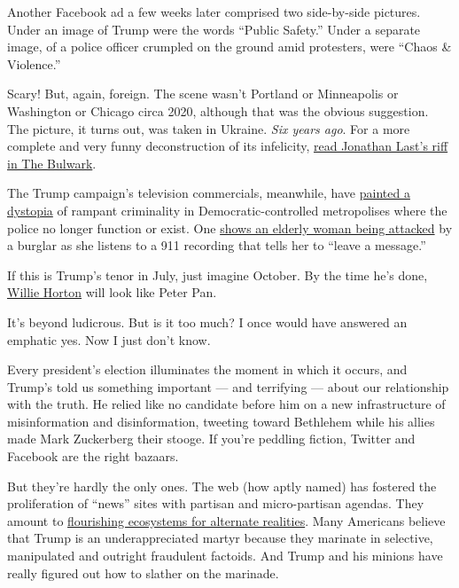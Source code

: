 Another Facebook ad a few weeks later comprised two side-by-side
pictures. Under an image of Trump were the words ``Public Safety.''
Under a separate image, of a police officer crumpled on the ground amid
protesters, were ``Chaos \& Violence.''

Scary! But, again, foreign. The scene wasn't Portland or Minneapolis or
Washington or Chicago circa 2020, although that was the obvious
suggestion. The picture, it turns out, was taken in Ukraine. \emph{Six
years ago}. For a more complete and very funny deconstruction of its
infelicity, \href{https://thebulwark.com/trumps-new-ad-is-amazing/}{read
Jonathan Last's riff in The Bulwark}.

The Trump campaign's television commercials, meanwhile, have
\href{https://www.nytimes3xbfgragh.onion/2020/07/21/us/politics/trump-portland-federal-agents.html}{painted
a dystopia} of rampant criminality in Democratic-controlled metropolises
where the police no longer function or exist. One
\href{https://www.nytimes3xbfgragh.onion/2020/07/21/us/politics/trump-portland-federal-agents.html}{shows
an elderly woman being attacked} by a burglar as she listens to a 911
recording that tells her to ``leave a message.''

If this is Trump's tenor in July, just imagine October. By the time he's
done,
\href{https://www.cnn.com/2018/11/01/politics/willie-horton-ad-1988-explainer-trnd/index.html}{Willie
Horton} will look like Peter Pan.

It's beyond ludicrous. But is it too much? I once would have answered an
emphatic yes. Now I just don't know.

Every president's election illuminates the moment in which it occurs,
and Trump's told us something important --- and terrifying --- about our
relationship with the truth. He relied like no candidate before him on a
new infrastructure of misinformation and disinformation, tweeting toward
Bethlehem while his allies made Mark Zuckerberg their stooge. If you're
peddling fiction, Twitter and Facebook are the right bazaars.

But they're hardly the only ones. The web (how aptly named) has fostered
the proliferation of ``news'' sites with partisan and micro-partisan
agendas. They amount to
\href{https://www.nytimes3xbfgragh.onion/2018/10/30/opinion/internet-violence-hate-prejudice.html}{flourishing
ecosystems for alternate realities}. Many Americans believe that Trump
is an underappreciated martyr because they marinate in selective,
manipulated and outright fraudulent factoids. And Trump and his minions
have really figured out how to slather on the marinade.

